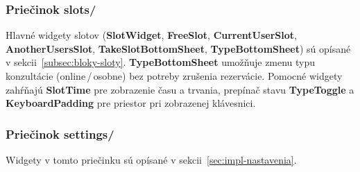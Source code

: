 \subsubsection{Priečinok slots/}
Hlavné widgety slotov (\textbf{SlotWidget}, \textbf{FreeSlot}, \textbf{CurrentUserSlot},
\textbf{AnotherUsersSlot}, \textbf{TakeSlotBottomSheet}, \textbf{TypeBottomSheet})
sú opísané v sekcii~\ref{subsec:bloky-sloty}. \textbf{TypeBottomSheet} umožňuje
zmenu typu konzultácie (online\,/\,osobne) bez potreby zrušenia rezervácie. Pomocné widgety zahŕňajú
\textbf{SlotTime} pre zobrazenie času a trvania, prepínač stavu \textbf{TypeToggle} a \textbf{KeyboardPadding} pre priestor pri zobrazenej klávesnici.

\subsubsection{Priečinok settings/}
Widgety v tomto priečinku sú opísané v sekcii~\ref{sec:impl-nastavenia}.
